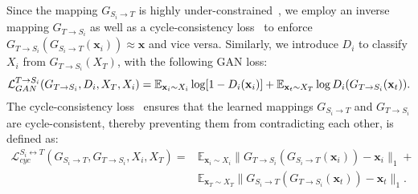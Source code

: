 \documentclass{article}
\begin{document}
Since the mapping $G_{S_i\rightarrow T}$ is highly under-constrained~\cite{goodfellow2014generative}, we employ an inverse mapping $G_{T\rightarrow S_i}$ as well as a cycle-consistency loss~\cite{zhu2017unpaired} to enforce $G_{T\rightarrow S_i}(G_{S_i\rightarrow T}(\mathbf{x}_i)) \approx \mathbf{x}$ and vice versa. Similarly, we introduce $D_i$ to classify $X_i$ from $G_{T\rightarrow S_i}(X_T)$, with the following GAN loss:
\begin{equation}
\mathcal{L}_{GAN}^{T\rightarrow S_i}(G_{T\rightarrow S_{i}},D_{i}, X_T, X_{i})=\mathbb{E}_{\mathbf{x}_{i}\sim X_{i}}\log [1-D_{i}(\mathbf{x}_{i})]+\mathbb{E}_{\mathbf{x}_t\sim X_T}\log D_{i}(G_{T\rightarrow S_{i}}(\mathbf{x}_t)).\\
\label{equ:ganSourceTSi}
\end{equation}
The cycle-consistency loss~\cite{zhu2017unpaired} ensures that the learned mappings $G_{S_i\rightarrow T}$ and $G_{T\rightarrow S_i}$ are cycle-consistent, thereby preventing them from contradicting each other, is defined as:
\begin{equation}
\begin{aligned}
\mathcal{L}_{cyc}^{S_i\leftrightarrow T}(G_{S_i\rightarrow T},G_{T\rightarrow S_i}, X_{i}, X_T)=&\mathbb{E}_{\mathbf{x}_{i}\sim X_{i}}\parallel G_{T\rightarrow S_{i}}(G_{S_{i}\rightarrow T}(\mathbf{x}_{i}))-\mathbf{x}_{i}\parallel_1+\\
&\mathbb{E}_{\mathbf{x}_T\sim X_T}\parallel G_{S_{i}\rightarrow T}(G_{T\rightarrow S_{i}}(\mathbf{x}_t))-\mathbf{x}_t\parallel_1.\\
\end{aligned}
\label{equ:cycSourceSiT}
\end{equation}
\end{document}
